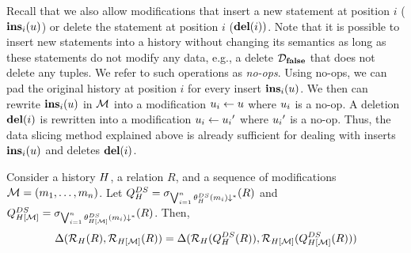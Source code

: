 \begin{exam}
\end{exam}



Recall that we also allow modifications that insert a new statement at position $i$ ($\mathbf{ins}_{i}(u)$) or delete the statement at position $i$ ($\mathbf{del}(i))$. Note that it is possible to insert new statements into a history without changing its semantics as long as these statements do not modify any data, e.g., a delete $\mathcal{D}_{\mathbf{false}}$ that does not delete any tuples. We refer to such operations as \emph{no-ops}. Using no-ops, we can pad the original history at position $i$ for every insert $\mathbf{ins}_{i}(u)$. We then can rewrite  $\mathbf{ins}_{i}(u)$ in $\mathcal{M}$ into a modification $u_i \gets u$ where $u_i$ is a no-op. A deletion $\mathbf{del}(i)$ is rewritten into a modification $u_i \gets {u_i}'$ where ${u_i}'$ is a no-op. Thus, the data slicing method explained above is already sufficient for dealing with inserts $\mathbf{ins}_{i}(u)$ and deletes $\mathbf{del}(i)$.

\begin{theo}\label{theo:data-slicing}
  Consider a history $H$, a relation $R$, and a sequence of modifications $\mathcal{M} = (m_1, \ldots, m_n)$. Let $Q_{H}^{DS} = \sigma_{\bigvee_{i=1}^{n} {\theta_{H}^{DS}(m_i)}\downarrow^{\ast}}(R)$
and $Q_{H[\mathcal{M}]}^{DS} = \sigma_{\bigvee_{i=1}^{n} {\theta_{H[\mathcal{M}]}^{DS}(m_i)}\downarrow^{\ast}}(R)$.
  Then,
\[
  \Delta(\mathcal{R}_{H}(R),\mathcal{R}_{H[\mathcal{M}]}(R))
  =
\Delta(\mathcal{R}_{H}(Q_{H}^{DS}(R)),\mathcal{R}_{H[\mathcal{M}]}(Q_{H[\mathcal{M}]}^{DS}(R)))
\]
\end{theo}
\iftechreport{}

